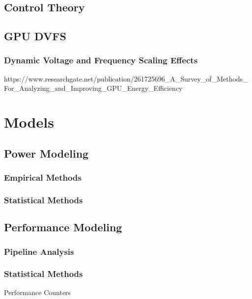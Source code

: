 \subsection{Control Theory}
\subsection{GPU DVFS}
\subsubsection{Dynamic Voltage and Frequency Scaling Effects}
\label{section:solarch}
https://www.researchgate.net/publication/261725696_A_Survey_of_Methods_For_Analyzing_and_Improving_GPU_Energy_Efficiency
\section{Models}
\subsection{Power Modeling}
\label{section:powermodels}
\subsubsection{Empirical Methods}
\subsubsection{Statistical Methods}

\subsection{Performance Modeling}
\label{section:powermodels}
\subsubsection{Pipeline Analysis}
\subsubsection{Statistical Methods}
Performance Counters

